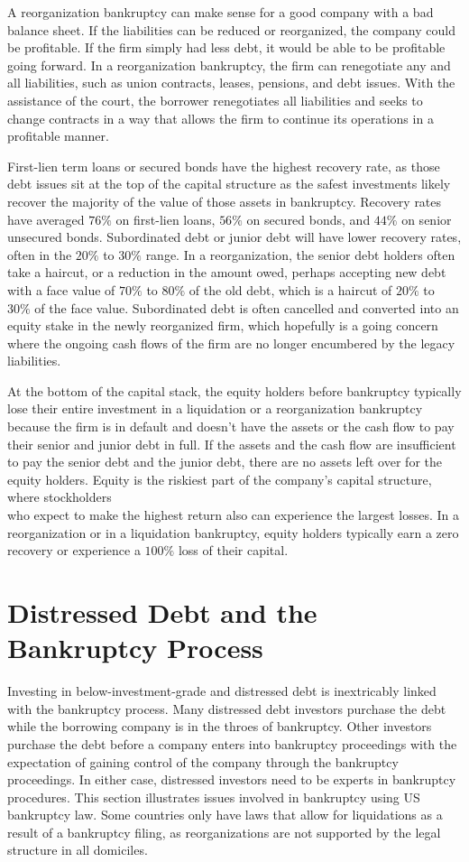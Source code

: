\documentclass[11pt]{article}
\begin{document}
A reorganization bankruptcy can make sense for a good company with a bad balance sheet. If the liabilities can be reduced or reorganized, the company could be profitable. If the firm simply had less debt, it would be able to be profitable going forward. In a reorganization bankruptcy, the firm can renegotiate any and all liabilities, such as union contracts, leases, pensions, and debt issues. With the assistance of the court, the borrower renegotiates all liabilities and seeks to change contracts in a way that allows the firm to continue its operations in a profitable manner.

First-lien term loans or secured bonds have the highest recovery rate, as those debt issues sit at the top of the capital structure as the safest investments likely recover the majority of the value of those assets in bankruptcy. Recovery rates have averaged $76 \%$ on first-lien loans, $56 \%$ on secured bonds, and $44 \%$ on senior unsecured bonds. Subordinated debt or junior debt will have lower recovery rates, often in the $20 \%$ to $30 \%$ range. In a reorganization, the senior debt holders often take a haircut, or a reduction in the amount owed, perhaps accepting new debt with a face value of $70 \%$ to $80 \%$ of the old debt, which is a haircut of $20 \%$ to $30 \%$ of the face value. Subordinated debt is often cancelled and converted into an equity stake in the newly reorganized firm, which hopefully is a going concern where the ongoing cash flows of the firm are no longer encumbered by the legacy liabilities.

At the bottom of the capital stack, the equity holders before bankruptcy typically lose their entire investment in a liquidation or a reorganization bankruptcy because the firm is in default and doesn't have the assets or the cash flow to pay their senior and junior debt in full. If the assets and the cash flow are insufficient to pay the senior debt and the junior debt, there are no assets left over for the equity holders. Equity is the riskiest part of the company's capital structure, where stockholders\\
who expect to make the highest return also can experience the largest losses. In a reorganization or in a liquidation bankruptcy, equity holders typically earn a zero recovery or experience a $100 \%$ loss of their capital.

\section*{Distressed Debt and the Bankruptcy Process}
Investing in below-investment-grade and distressed debt is inextricably linked with the bankruptcy process. Many distressed debt investors purchase the debt while the borrowing company is in the throes of bankruptcy. Other investors purchase the debt before a company enters into bankruptcy proceedings with the expectation of gaining control of the company through the bankruptcy proceedings. In either case, distressed investors need to be experts in bankruptcy procedures. This section illustrates issues involved in bankruptcy using US bankruptcy law. Some countries only have laws that allow for liquidations as a result of a bankruptcy filing, as reorganizations are not supported by the legal structure in all domiciles.
\end{document}
